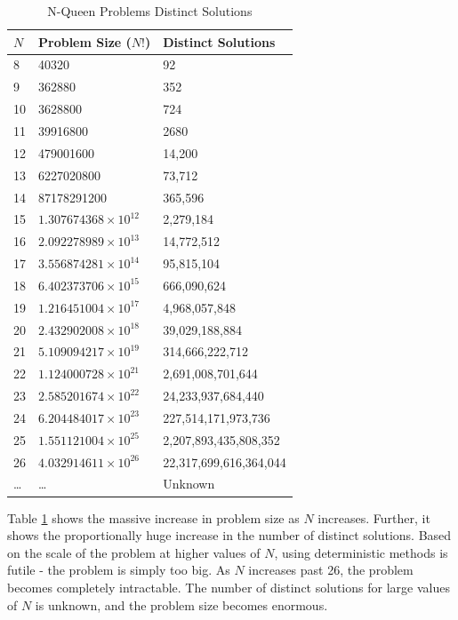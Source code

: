 \documentclass[conference]{IEEEtran}
\begin{document}
\begin{table}[h!]
\centering
\caption{N-Queen Problems Distinct Solutions}
\label{table:probgrowth}
\begin{tabular}{|l|l|l|} \hline
$N$  & Problem Size ($N!$)      & Distinct Solutions     \\ \hline
8  & 40320                      & 92                     \\
9  & 362880                     & 352                    \\
10 & 3628800                    & 724                    \\
11 & 39916800                   & 2680                   \\
12 & 479001600                  & 14,200                 \\
13 & 6227020800                 & 73,712                 \\
14 & 87178291200                & 365,596                \\
15 & $1.307674368\times10^{12}$ & 2,279,184              \\
16 & $2.092278989\times10^{13}$ & 14,772,512             \\
17 & $3.556874281\times10^{14}$ & 95,815,104             \\
18 & $6.402373706\times10^{15}$ & 666,090,624            \\
19 & $1.216451004\times10^{17}$ & 4,968,057,848          \\
20 & $2.432902008\times10^{18}$ & 39,029,188,884         \\
21 & $5.109094217\times10^{19}$ & 314,666,222,712        \\
22 & $1.124000728\times10^{21}$ & 2,691,008,701,644      \\
23 & $2.585201674\times10^{22}$ & 24,233,937,684,440     \\
24 & $6.204484017\times10^{23}$ & 227,514,171,973,736    \\
25 & $1.551121004\times10^{25}$ & 2,207,893,435,808,352  \\
26 & $4.032914611\times10^{26}$ & 22,317,699,616,364,044 \\
\dots & \dots & Unknown				\\
\hline\end{tabular}
\end{table}

Table \ref{table:probgrowth} shows the massive increase in problem size as $N$ increases. Further, it shows the proportionally huge increase in the number of distinct solutions. Based on the scale of the problem at higher values of $N$, using deterministic methods is futile - the problem is simply too big. As $N$ increases past 26, the problem becomes completely intractable. The number of distinct solutions for large values of $N$ is unknown, and the problem size becomes enormous. 
\end{document}
